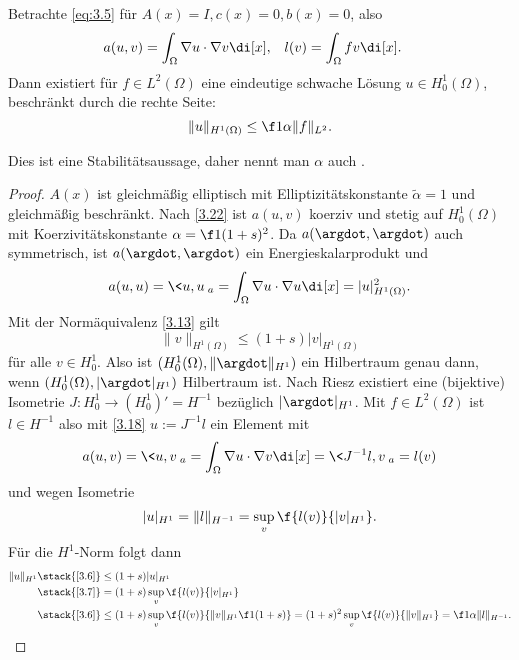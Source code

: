 \begin{st} \label{3.26}
	Betrachte \eqref{eq:3.5} für $A(x) = I, c(x) = 0, b(x) = 0$, also
	\begin{align*}
		a(u,v) &= \int_\Omega \nabla u \cdot \nabla v \di[x], &
		l(v) &= \int_\Omega f v \di[x].
	\end{align*}
	Dann existiert für $f \in L^2(\Omega)$ eine eindeutige schwache Lösung $u \in H_0^1(\Omega)$, beschränkt durch die rechte Seite:
	\[
		\|u\|_{H^1(\Omega)} \le \f 1{\alpha} \|f\|_{L^2}.
	\]
	\begin{note}
		Dies ist eine Stabilitätsaussage, daher nennt man $\alpha$ auch .
	\end{note}
	\begin{proof}
		$A(x)$ ist gleichmäßig elliptisch mit Elliptizitätskonstante $\tilde \alpha = 1$ und gleichmäßig beschränkt.
		Nach \ref{3.22} ist $a(u,v)$ koerziv und stetig auf $H_0^1(\Omega)$ mit Koerzivitätskonstante $\alpha = \f 1{(1+s)^2}$.
		Da $a(\argdot, \argdot)$ auch symmetrisch, ist $a(\argdot, \argdot)$ ein Energieskalarprodukt und
		\[
			a(u,u)
			= \<u,u\>_a
			= \int_\Omega \nabla u \cdot \nabla u \di[x]
			= |u|_{H^1(\Omega)}^2.
		\]
		Mit der Normäquivalenz \ref{3.13} gilt
		\begin{equation} \label{eq:3.6}
			\|v\|_{H^1(\Omega)}
			\le (1+s) |v|_{H^1(\Omega)}
		\end{equation}
		für alle $v \in H_0^1$.
		Also ist $(H_0^1(\Omega), \|\argdot\|_{H^1})$ ein Hilbertraum genau dann, wenn $(H_0^1(\Omega), |\argdot|_{H^1})$ Hilbertraum ist.
		Nach Riesz existiert eine (bijektive) Isometrie $J: H_0^1 \to (H_0^1)' = H^{-1}$ bezüglich $|\argdot|_{H^1}$.
		Mit $f \in L^2(\Omega)$ ist $l \in H^{-1}$ also mit \ref{3.18} $u := J^{-1} l$ ein Element mit
		\[
			a(u,v)
			= \<u,v\>_a
			= \int_\Omega \nabla u \cdot \nabla v \di[x]
			= \<J^{-1}l, v\>_a
			= l(v)
		\]
		und wegen Isometrie
		\begin{equation} \label{eq:3.7}
			|u|_{H^1} = \|l\|_{H^{-1}}
			= \sup_{v} \f{l(v)}{|v|_{H^1}}.
		\end{equation}
		Für die $H^1$-Norm folgt dann
		\begin{align*}
			\|u\|_{H^1}
			&\stack{\eqref{3.6}}\le (1+s)|u|_{H^1} \\
			&\stack{\eqref{3.7}}= (1+s) \sup_v \f{l(v)}{|v|_{H^1}} \\
			&\stack{\eqref{3.6}}\le (1+s) \sup_{v} \f{l(v)}{\|v\|_{H^1} \f 1{(1+s)}}
			= (1+s)^2 \sup_v \f{l(v)}{\|v\|_{H^1}}
			= \f 1{\alpha} \|l\|_{H^{-1}}.
		\end{align*}
	\end{proof}
\end{st}

